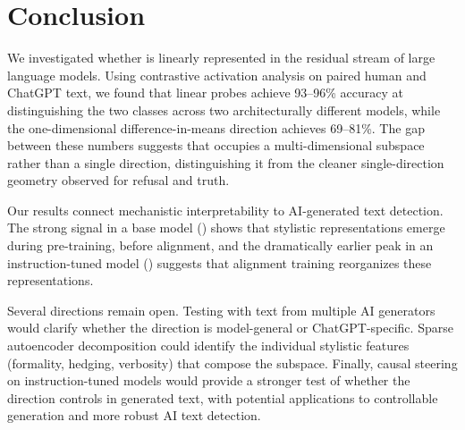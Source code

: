 \section{Conclusion}
\label{sec:conclusion}

We investigated whether \aistyle is linearly represented in the residual stream of large language models.
Using contrastive activation analysis on paired human and ChatGPT text, we found that linear probes achieve 93--96\% accuracy at distinguishing the two classes across two architecturally different models, while the one-dimensional difference-in-means direction achieves 69--81\%.
The gap between these numbers suggests that \aistyle occupies a multi-dimensional subspace rather than a single direction, distinguishing it from the cleaner single-direction geometry observed for refusal and truth.

Our results connect mechanistic interpretability to AI-generated text detection.
The strong signal in a base model (\pythia) shows that stylistic representations emerge during pre-training, before alignment, and the dramatically earlier peak in an instruction-tuned model (\qwen) suggests that alignment training reorganizes these representations.

Several directions remain open.
Testing with text from multiple AI generators would clarify whether the direction is model-general or ChatGPT-specific.
Sparse autoencoder decomposition could identify the individual stylistic features (formality, hedging, verbosity) that compose the subspace.
Finally, causal steering on instruction-tuned models would provide a stronger test of whether the direction controls \aistyle in generated text, with potential applications to controllable generation and more robust AI text detection.

